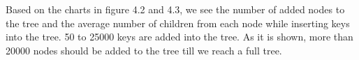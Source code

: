 \documentclass[12pt]{report}
\begin{document}

Based on the charts in figure 4.2 and 4.3, we see the number of added nodes to the tree and the average number of children from each node while inserting keys into the tree. 50 to 25000 keys are added into the tree. As it is shown, more than 20000 nodes should be added to the tree till we reach a full tree. 
\end{document}
